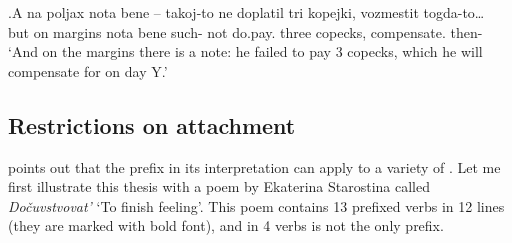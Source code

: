 \exg.\label{ex:do:measure}A na poljax nota bene -- takoj-to ne doplatil tri kopejki, vozmestit togda-to…\\
but on margins nota bene {} such- not do.pay. three copecks, compensate. then-\\
\trans `And on the margins there is a note: he failed to pay 3 copecks, which he will compensate for on day Y.'\\

\subsection{Restrictions on attachment}
\citet[236]{Kagan:12} points out that the prefix  in its  interpretation can apply to a variety of . Let me first illustrate this thesis with a poem by Ekaterina Starostina called \textit{Do\v{c}uvstvovat'} `To finish feeling'. This poem contains 13 prefixed verbs in 12 lines (they are marked with bold font), and in 4 verbs  is not the only prefix.\pagebreak

